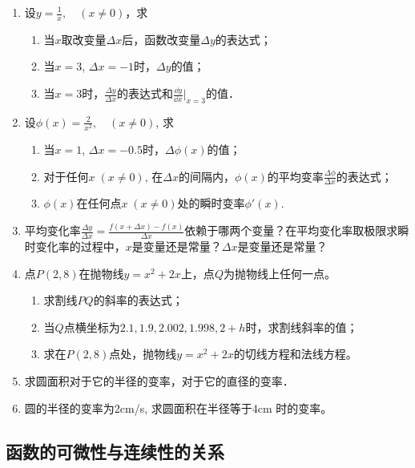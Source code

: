\begin{ex}
\begin{enumerate}
    \item 设$y=\frac{1}{x},\quad (x\ne 0)$，求
\begin{enumerate}
    \item 当$x$取改变量$\Delta x$后，函数改变量$\Delta y$的表达式；
    \item 当$x=3$, $\Delta x=-1$时，$\Delta y$的值；
    \item 当$x=3$时，$\frac{\Delta y}{\Delta x}$的表达式和$\frac{\dd y}{\dd x}\Big|_{x=3}$的值．
\end{enumerate}

    \item 设$\phi(x)=\frac{2}{x^2},\quad (x\ne0)$, 求
\begin{enumerate}
\item 当$x=1$, $\Delta x=-0.5$时，$\Delta \phi(x)$的值；
\item 对于任何$x\; (x\ne 0)$, 在$\Delta x$的间隔内，$\phi(x)$的平均变率$\frac{\Delta \phi}{\Delta x}$的表达式；
\item $\phi(x)$在任何点$x\; (x\ne 0)$处的瞬时变率$\phi'(x)$.
\end{enumerate}

    \item 平均变化率$\frac{\Delta y}{\Delta x}=\frac{f (x+\Delta x) -f (x)}{\Delta x}$依赖于哪两个变量？在平均变化率取极限求瞬时变化率的过程中，$x$是变量还是常量？$\Delta x$是变量还是常量？
    \item 点$P(2, 8)$在抛物线$y=x^2+2x$上，点$Q$为抛物线上任何一点。
\begin{enumerate}
    \item 求割线$PQ$的斜率的表达式；
  \item 当$Q$点横坐标为$2.1, 1.9, 2.002, 1.998, 2+h$时，求割线斜率的值；
\item 求在$P(2, 8)$点处，抛物线$y=x^2+2x$的切线方程和法线方程。
\end{enumerate}    

\item 求圆面积对于它的半径的变率，对于它的直径的变率．
\item 圆的半径的变率为2cm/s, 求圆面积在半径等于4cm
时的变率。
\end{enumerate}
\end{ex}

\subsection{函数的可微性与连续性的关系}

